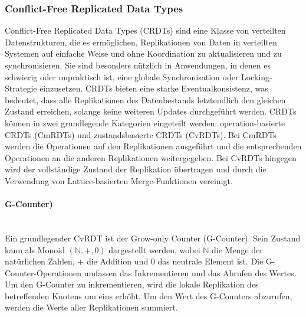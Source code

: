 \documentclass[../vs-script-first-v01.tex]{subfiles}
\begin{document}
\subsubsection{Conflict-Free Replicated Data Types}
Conflict-Free Replicated Data Types (CRDTs) sind eine Klasse von verteilten Datenstrukturen, die es ermöglichen, Replikationen von Daten in verteilten Systemen auf einfache Weise und ohne Koordination zu aktualisieren und zu synchronisieren. Sie sind besonders nützlich in Anwendungen, in denen es schwierig oder unpraktisch ist, eine globale Synchronisation oder Locking-Strategie einzusetzen. CRDTs bieten eine starke Eventualkonsistenz, was bedeutet, dass alle Replikationen des Datenbestands letztendlich den gleichen Zustand erreichen, solange keine weiteren Updates durchgeführt werden.
CRDTs können in zwei grundlegende Kategorien eingeteilt werden: operation-basierte CRDTs (CmRDTs) und zustandsbasierte CRDTs (CvRDTs). Bei CmRDTs werden die Operationen auf den Replikationen ausgeführt und die entsprechenden Operationen an die anderen Replikationen weitergegeben. Bei CvRDTs hingegen wird der vollständige Zustand der Replikation übertragen und durch die Verwendung von Lattice-basierten Merge-Funktionen vereinigt.
\paragraph{G-Counter)}\mbox{}\\
Ein grundlegender CvRDT ist der Grow-only Counter (G-Counter). Sein Zustand kann als Monoid $(\mathbb{N}, +, 0)$ dargestellt werden, wobei $\mathbb{N}$ die Menge der natürlichen Zahlen, $+$ die Addition und $0$ das neutrale Element ist. Die G-Counter-Operationen umfassen das Inkrementieren und das Abrufen
des Wertes. Um den G-Counter zu inkrementieren, wird die lokale Replikation des betreffenden Knotens um eins erhöht. Um den Wert des G-Counters abzurufen, werden die Werte aller Replikationen summiert.
\end{document}
